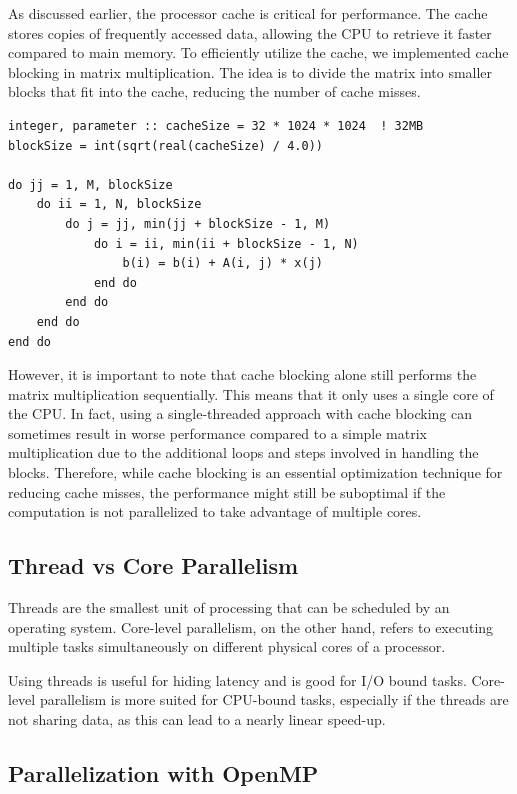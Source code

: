 As discussed earlier, the processor cache is critical for performance. The cache stores copies of frequently accessed data, allowing the CPU to retrieve it faster compared to main memory. To efficiently utilize the cache, we implemented cache blocking in matrix multiplication. The idea is to divide the matrix into smaller blocks that fit into the cache, reducing the number of cache misses. 

\begin{lstlisting}
integer, parameter :: cacheSize = 32 * 1024 * 1024  ! 32MB
blockSize = int(sqrt(real(cacheSize) / 4.0))

do jj = 1, M, blockSize
    do ii = 1, N, blockSize
        do j = jj, min(jj + blockSize - 1, M)
            do i = ii, min(ii + blockSize - 1, N)
                b(i) = b(i) + A(i, j) * x(j)
            end do
        end do
    end do
end do
\end{lstlisting}


However, it is important to note that cache blocking alone still performs the matrix multiplication sequentially. This means that it only uses a single core of the CPU. In fact, using a single-threaded approach with cache blocking can sometimes result in worse performance compared to a simple matrix multiplication due to the additional loops and steps involved in handling the blocks. Therefore, while cache blocking is an essential optimization technique for reducing cache misses, the performance might still be suboptimal if the computation is not parallelized to take advantage of multiple cores.

\subsection{Thread vs Core Parallelism}

Threads are the smallest unit of processing that can be scheduled by an operating system. Core-level parallelism, on the other hand, refers to executing multiple tasks simultaneously on different physical cores of a processor.

Using threads is useful for hiding latency and is good for I/O bound tasks. Core-level parallelism is more suited for CPU-bound tasks, especially if the threads are not sharing data, as this can lead to a nearly linear speed-up.

\subsection{Parallelization with OpenMP}

